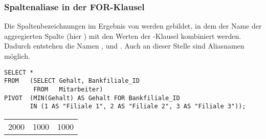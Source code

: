         \subsubsection{Spaltenaliase in der FOR-Klausel}
          Die Spaltenbezeichnungen im Ergebnis von  werden
          gebildet, in dem der Name der aggregierten Spalte (hier
          ) mit den Werten der -Klausel
          kombiniert werden. Dadurch entstehen die Namen ,
           und . Auch an dieser
          Stelle sind Aliasnamen m\"oglich.
\clearpage
          \begin{lstlisting}[language=oracle_sql,caption={Die \languageorasql{FOR}-Klausel mit Aliasnamen},label=sql06_20]
SELECT *
FROM   (SELECT Gehalt, Bankfiliale_ID
        FROM   Mitarbeiter)
PIVOT  (MIN(Gehalt) AS Gehalt FOR Bankfiliale_ID
       IN (1 AS "Filiale 1", 2 AS "Filiale 2", 3 AS "Filiale 3"));
          \end{lstlisting}
          \begin{center}
            \begin{small}
              \tablehead{}
              \begin{oraclesql}
                \begin{supertabular}{rrr}
                  2000 & 1000 & 1000 \\
                \end{supertabular}
              \end{oraclesql}
            \end{small}
          \end{center}
